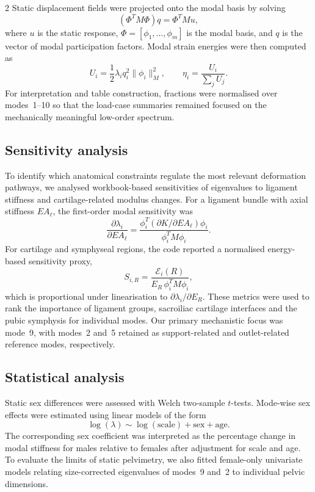 \documentclass[openacc]{rsproca_new}
\begin{document}
\begin{multicols}{2}
Static displacement fields were projected onto the modal basis by solving
\begin{equation}
(\Phi^{T}M\Phi)q = \Phi^{T}Mu,
\end{equation}
where $u$ is the static response, $\Phi=[\phi_{1},\ldots,\phi_{m}]$ is the modal basis, and $q$ is the vector of modal participation factors. Modal strain energies were then computed as
\begin{equation}
U_{i}=\frac{1}{2}\lambda_{i}q_{i}^{2}\|\phi_{i}\|_{M}^{2}, \qquad
\eta_{i}=\frac{U_{i}}{\sum_{j}U_{j}}.
\end{equation}
For interpretation and table construction, fractions were normalised over modes~1--10 so that the load-case summaries remained focused on the mechanically meaningful low-order spectrum.

\subsection{Sensitivity analysis}

To identify which anatomical constraints regulate the most relevant deformation pathways, we analysed workbook-based sensitivities of eigenvalues to ligament stiffness and cartilage-related modulus changes. For a ligament bundle with axial stiffness $EA_{\ell}$, the first-order modal sensitivity was
\begin{equation}
\frac{\partial \lambda_{i}}{\partial EA_{\ell}}
=
\frac{\phi_{i}^{T}(\partial K/\partial EA_{\ell})\phi_{i}}
{\phi_{i}^{T}M\phi_{i}}.
\end{equation}
For cartilage and symphyseal regions, the code reported a normalised energy-based sensitivity proxy,
\begin{equation}
S_{i,R}=\frac{\mathcal{E}_{i}(R)}{E_{R}\,\phi_{i}^{T}M\phi_{i}},
\end{equation}
which is proportional under linearisation to $\partial \lambda_{i}/\partial E_{R}$. These metrics were used to rank the importance of ligament groups, sacroiliac cartilage interfaces and the pubic symphysis for individual modes. Our primary mechanistic focus was mode~9, with modes~2 and~5 retained as support-related and outlet-related reference modes, respectively.

\subsection{Statistical analysis}

Static sex differences were assessed with Welch two-sample $t$-tests. Mode-wise sex effects were estimated using linear models of the form
\begin{equation}
\log(\lambda) \sim \log(\mathrm{scale}) + \mathrm{sex} + \mathrm{age}.
\end{equation}
The corresponding sex coefficient was interpreted as the percentage change in modal stiffness for males relative to females after adjustment for scale and age. To evaluate the limits of static pelvimetry, we also fitted female-only univariate models relating size-corrected eigenvalues of modes~9 and~2 to individual pelvic dimensions.


\end{multicols}
\end{document}
